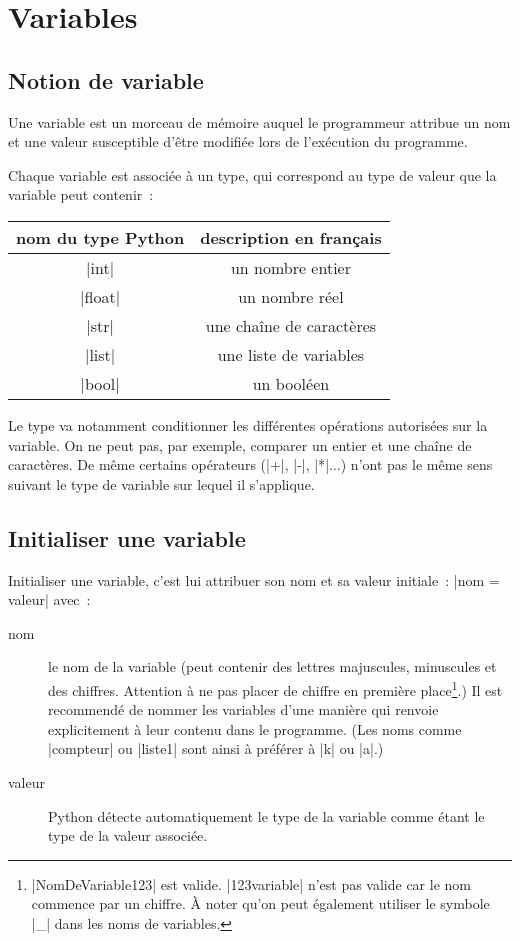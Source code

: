 \section{Variables}

	\subsection{Notion de variable}
		
		Une variable est un morceau de mémoire auquel le programmeur attribue un nom et une valeur susceptible d'être modifiée lors de l'exécution du programme.
		
		Chaque variable est associée à un type, qui correspond au type de valeur que la variable peut contenir~: \\
		
		\begin{tabular}{|c|c|} \hline
			nom du type Python & description en français \\ \hline \hline
			\python|int| & un nombre entier \\ \hline
			\python|float| & un nombre réel \\ \hline
			\python|str| & une chaîne de caractères \\ \hline
			\python|list| & une liste de variables \\ \hline
			\python|bool| & un booléen \\ \hline
		\end{tabular}

		Le type va notamment conditionner les différentes opérations autorisées sur la variable.
		On ne peut pas, par exemple, comparer un entier et une chaîne de caractères. De même certains opérateurs (\python|+|, \python|-|, \python|*|$\ldots$) n'ont pas le même sens suivant le type de variable sur lequel il s'applique. \\
		
	\subsection{Initialiser une variable}
		
		Initialiser une variable, c'est lui attribuer son nom et sa valeur initiale~: \python|nom = valeur| avec~:
		\begin{description}
			\item[nom] le nom de la variable (peut contenir des lettres majuscules, minuscules et des chiffres.
			Attention à ne pas placer de chiffre en première place\footnote{\python|NomDeVariable123| est valide. \python|123variable| n'est pas valide car le nom commence par un chiffre. À noter qu'on peut également utiliser le symbole \python|_| dans les noms de variables.}.)
			Il est recommendé de nommer les variables d'une manière qui renvoie explicitement à leur contenu dans le programme. (Les noms comme \python|compteur| ou \python|liste1| sont ainsi à préférer à \python|k| ou \python|a|.)
			\item[valeur] Python détecte automatiquement le type de la variable comme étant le type de la valeur associée.
		\end{description}
		
